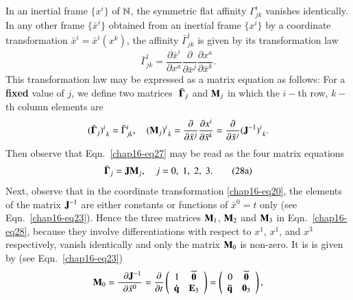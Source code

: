 In an inertial frame $\{x^i\}$ of $\mathbb{N}$, the symmetric flat affinity $\Gamma^i_{jk}$ vanishes identically. In any other frame $\{\bar{x}^i\}$ obtained from an inertial frame $\{x^i\}$ by a coordinate transformation $\bar{x}^i=\bar{x}^i(x^k)$,  the affinity $\bar{\Gamma}^i_{jk}$ is given by its  transformation law
\begin{equation}
\bar{\Gamma}^i_{jk}=\frac{\partial \bar{x}^i}{\partial x^a} \frac{\partial}{\partial \bar{x}^j}\frac{\partial x^a} {\partial \bar{x}^k}.\label{chap16-eq27}
\end{equation}
This transformation law may be expressed as a matrix equation as follows: For a \textbf{fixed} value of  $j$, we define two matrices  $\bar{\,\,\bm{\Gamma}_j} $ and ${\mathbf{M}}_j$ in which the $i-$th row, $k-$th column elements are
\begin{equation}
(\bar{\bm{\Gamma}}_j)^i_{\;\,k}=\bar{\Gamma}^i_{jk} , \quad ({\mathbf{M}}_j )^i_{\;\,k}= \frac{\partial}{\partial \bar{x}^j}\frac{\partial x^i} {\partial \bar{x}^k} =\frac{\partial}{\partial \bar{x}^j} ({\mathbf{J}^{-1}})^i_{\;\,k}.\label{chap16-eq28}
\end{equation}
Then observe that Eqn.~\eqref{chap16-eq27} may be read as the four matrix equations  
\begin{equation*}
\bar{\bm{\Gamma}}_j= {\mathbf{J}}{\mathbf{M}}_j,\quad j=0,\;1,\;2,\;3.\tag{28a}\label{chap16-eq28a}
\end{equation*}
Next, observe that in the coordinate transformation \eqref{chap16-eq20}, the elements of the matrix  $\mathbf{J}^{-1}$ are either constants or  functions of  $\bar{x}^0=t$ only (see Eqn.~\eqref{chap16-eq23}). Hence the three matrices  ${\mathbf{M}}_1$, ${\mathbf{M}}_2$ and  ${\mathbf{M}}_3$ in Eqn.~\eqref{chap16-eq28}, because they involve differentiations with respect to $x^1$, $x^1$, and $x^3$ respectively, vanish identically and only the matrix  ${\mathbf{M}}_0$ is non-zero. It is is given by (see Eqn.~\eqref{chap16-eq23})
\begin{equation}
{\mathbf{M}}_0=\frac{\;\;\partial{\mathbf{J}}^{-1}} {\partial\bar{x} ^0} =\frac{\partial}{\partial t}\left(\begin{array}{rc} 1 &\widetilde{\mathbf{0}}  \\ \mathbf{\dot{q}} 
 & \mathbf{E}_3 \end{array}\right)=\left(\begin{array}{rc} 0 & \widetilde{\mathbf{0}} \\ \mathbf{\ddot{q}}  & \mathbf{0}_3 \end{array}\right),\label{chap16-eq29}
\end{equation}
